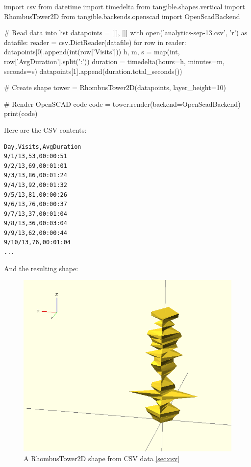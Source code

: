 \vspace{.5\baselineskip}
\begin{pythoncode}
import csv
from datetime import timedelta
from tangible.shapes.vertical import RhombusTower2D
from tangible.backends.openscad import OpenScadBackend

# Read data into list
datapoints = [[], []]
with open('analytics-sep-13.csv', 'r') as datafile:
    reader = csv.DictReader(datafile)
    for row in reader:
        datapoints[0].append(int(row['Visits']))
        h, m, s = map(int, row['AvgDuration'].split(':'))
        duration = timedelta(hours=h, minutes=m, seconds=s)
        datapoints[1].append(duration.total_seconds())

# Create shape
tower = RhombusTower2D(datapoints, layer_height=10)

# Render OpenSCAD code
code = tower.render(backend=OpenScadBackend)
print(code)
\end{pythoncode}
\vspace{.5\baselineskip}

\noindent Here are the CSV contents:

\vspace{.5\baselineskip}
\begin{verbatim}
Day,Visits,AvgDuration
9/1/13,53,00:00:51
9/2/13,69,00:01:01
9/3/13,86,00:01:24
9/4/13,92,00:01:32
9/5/13,81,00:00:26
9/6/13,76,00:00:37
9/7/13,37,00:01:04
9/8/13,36,00:03:04
9/9/13,62,00:00:44
9/10/13,76,00:01:04
...
\end{verbatim}
\vspace{.5\baselineskip}

\newpage \noindent And the resulting shape:

\begin{figure}[H]
	\centering
	\includegraphics[height=.3\textheight]{images/csv.png}
	\caption{A RhombusTower2D shape from CSV data \eqref{sec:csv}}
	\label{img:angle_pie}
\end{figure}


